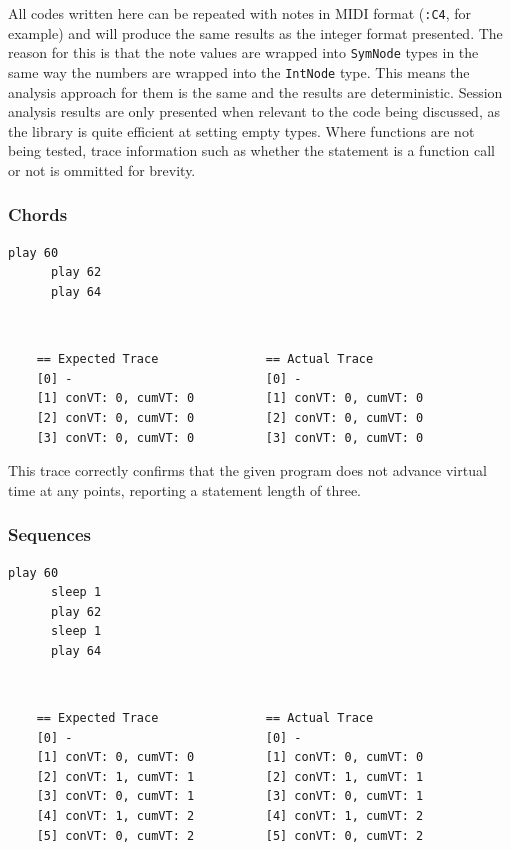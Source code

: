 \documentclass[11pt, abstracton, twoside, titlepage=true]{scrartcl}
\begin{document}
All codes written here can be repeated with notes in MIDI format (\texttt{:C4}, 
for example) and will produce the same results as the integer format presented.
The reason for this is that the note values are wrapped into \texttt{SymNode} types 
in the same way the numbers are wrapped into the \texttt{IntNode} type. This means 
the analysis approach for them is the same and the results are deterministic.
Session analysis results are only presented when relevant to the code being
discussed, as the library is quite efficient at setting empty types. Where functions
are not being tested, trace information such as whether the statement is a function 
call or not is ommitted for brevity.

\subsubsection{Chords}

\begin{minipage}{\textwidth}
	\begin{lstlisting}[style = sonicpi]
      play 60
      play 62
      play 64
	\end{lstlisting}
\end{minipage}
\\
\begin{lstlisting}
    == Expected Trace               == Actual Trace
    [0] -                           [0] -
    [1] conVT: 0, cumVT: 0          [1] conVT: 0, cumVT: 0
    [2] conVT: 0, cumVT: 0          [2] conVT: 0, cumVT: 0
    [3] conVT: 0, cumVT: 0          [3] conVT: 0, cumVT: 0
\end{lstlisting}

This trace correctly confirms that the given program does not advance virtual time 
at any points, reporting a statement length of three.

\subsubsection{Sequences}
\begin{minipage}{\textwidth}
	\begin{lstlisting}[style = sonicpi]
      play 60
      sleep 1
      play 62
      sleep 1
      play 64
	\end{lstlisting}
\end{minipage}
\\
\begin{lstlisting}
    == Expected Trace               == Actual Trace
    [0] -                           [0] -
    [1] conVT: 0, cumVT: 0          [1] conVT: 0, cumVT: 0
    [2] conVT: 1, cumVT: 1          [2] conVT: 1, cumVT: 1
    [3] conVT: 0, cumVT: 1          [3] conVT: 0, cumVT: 1
    [4] conVT: 1, cumVT: 2          [4] conVT: 1, cumVT: 2
    [5] conVT: 0, cumVT: 2          [5] conVT: 0, cumVT: 2
\end{lstlisting}
\end{document}
